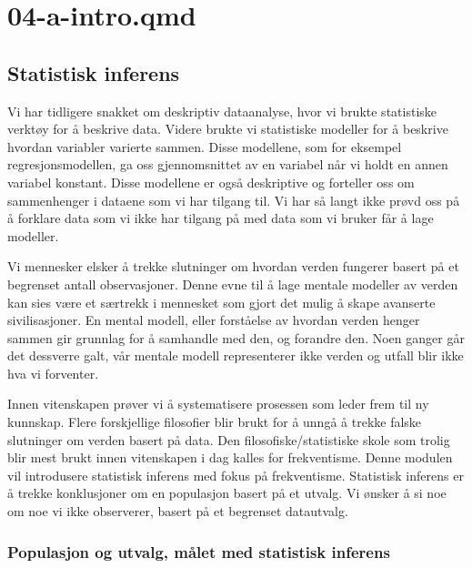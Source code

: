 \documentclass[
  letterpaper,
  DIV=11,
  numbers=noendperiod,
  oneside]{scrreprt}
\begin{document}
\hypertarget{section}{%
\chapter{}\label{section}}

\part{04-a-intro.qmd}

\hypertarget{statistisk-inferens}{%
\chapter{Statistisk inferens}\label{statistisk-inferens}}

Vi har tidligere snakket om deskriptiv dataanalyse, hvor vi brukte
statistiske verktøy for å beskrive data. Videre brukte vi statistiske
modeller for å beskrive hvordan variabler varierte sammen. Disse
modellene, som for eksempel regresjonsmodellen, ga oss gjennomsnittet av
en variabel når vi holdt en annen variabel konstant. Disse modellene er
også deskriptive og forteller oss om sammenhenger i dataene som vi har
tilgang til. Vi har så langt ikke prøvd oss på å forklare data som vi
ikke har tilgang på med data som vi bruker får å lage modeller.

Vi mennesker elsker å trekke slutninger om hvordan verden fungerer
basert på et begrenset antall observasjoner. Denne evne til å lage
mentale modeller av verden kan sies være et særtrekk i mennesket som
gjort det mulig å skape avanserte sivilisasjoner. En mental modell,
eller forståelse av hvordan verden henger sammen gir grunnlag for å
samhandle med den, og forandre den. Noen ganger går det dessverre galt,
vår mentale modell representerer ikke verden og utfall blir ikke hva vi
forventer.

Innen vitenskapen prøver vi å systematisere prosessen som leder frem til
ny kunnskap. Flere forskjellige filosofier blir brukt for å unngå å
trekke falske slutninger om verden basert på data. Den
filosofiske/statistiske skole som trolig blir mest brukt innen
vitenskapen i dag kalles for frekventisme. Denne modulen vil introdusere
statistisk inferens med fokus på frekventisme. Statistisk inferens er å
trekke konklusjoner om en populasjon basert på et utvalg. Vi ønsker å si
noe om noe vi ikke observerer, basert på et begrenset datautvalg.

\hypertarget{populasjon-og-utvalg-muxe5let-med-statistisk-inferens}{%
\section{Populasjon og utvalg, målet med statistisk
inferens}\label{populasjon-og-utvalg-muxe5let-med-statistisk-inferens}}
\end{document}
